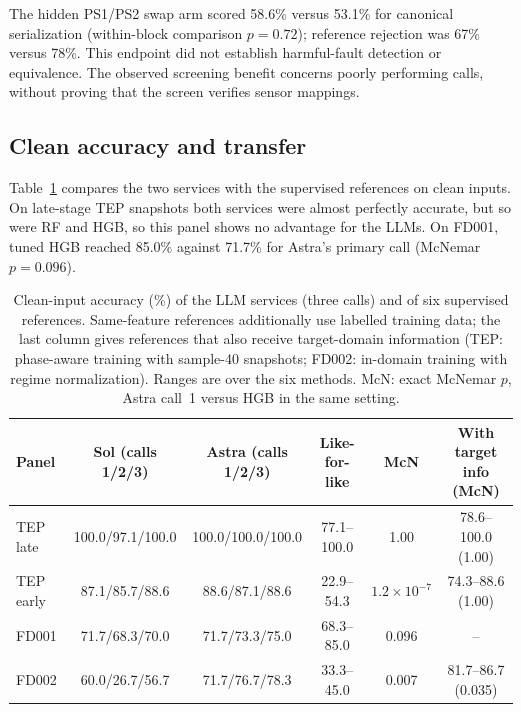 \documentclass[11pt,a4paper]{article}
\begin{document}
The hidden PS1/PS2 swap arm scored 58.6\% versus 53.1\% for canonical serialization (within-block comparison $p=0.72$); reference rejection was 67\% versus 78\%. This endpoint did not establish harmful-fault detection or equivalence. The observed screening benefit concerns poorly performing calls, without proving that the screen verifies sensor mappings.





\subsection{Clean accuracy and transfer}
Table~\ref{tab:transfer} compares the two services with the supervised references on clean inputs. On late-stage TEP snapshots both services were almost perfectly accurate, but so were RF and HGB, so this panel shows no advantage for the LLMs. On FD001, tuned HGB reached 85.0\% against 71.7\% for Astra's primary call (McNemar $p=0.096$).

\begin{table}[htbp]\centering\small
\caption{Clean-input accuracy (\%) of the LLM services (three calls) and of six supervised references. Same-feature references additionally use labelled training data; the last column gives references that also receive target-domain information (TEP: phase-aware training with sample-40 snapshots; FD002: in-domain training with regime normalization). Ranges are over the six methods. McN: exact McNemar $p$, Astra call~1 versus HGB in the same setting.}
\label{tab:transfer}
\setlength{\tabcolsep}{4pt}
\begin{tabular}{@{}lccccc@{}}\toprule
Panel & Sol (calls 1/2/3) & Astra (calls 1/2/3) & Like-for-like & McN & With target info (McN) \\\midrule
TEP late & 100.0/97.1/100.0 & 100.0/100.0/100.0 & 77.1--100.0 & 1.00 & 78.6--100.0 (1.00) \\
TEP early & 87.1/85.7/88.6 & 88.6/87.1/88.6 & 22.9--54.3 & $1.2\times10^{-7}$ & 74.3--88.6 (1.00) \\
FD001 & 71.7/68.3/70.0 & 71.7/73.3/75.0 & 68.3--85.0 & 0.096 & -- \\
FD002 & 60.0/26.7/56.7 & 71.7/76.7/78.3 & 33.3--45.0 & 0.007 & 81.7--86.7 (0.035) \\
\bottomrule\end{tabular}\end{table}
\end{document}
